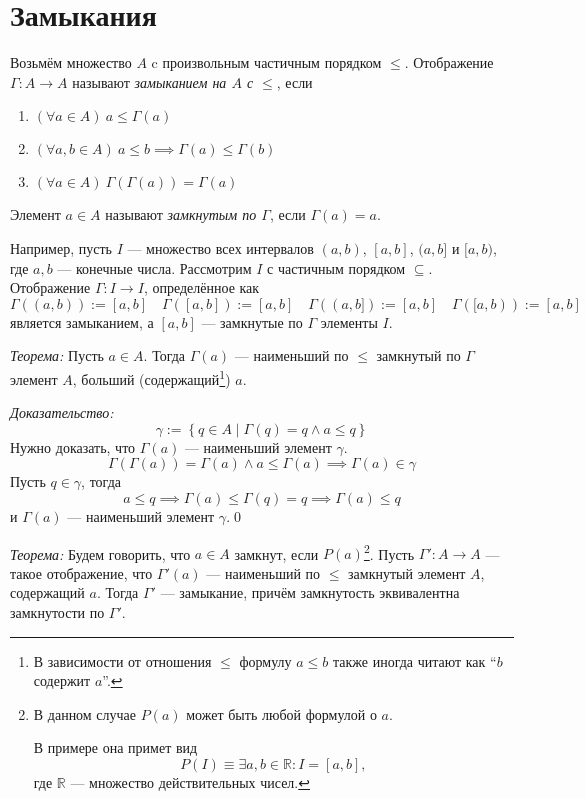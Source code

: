 \section{Замыкания}

Возьмём множество $A$ c произвольным частичным порядком $\leq$. Отображение
$\Gamma:A\to A$ называют {\it замыканием на $A$ с $\leq$}, если
\begin{enumerate}
  \item{}$(\forall a\in A)~a\leq\Gamma(a)$
  \item{}$(\forall a,b\in A)~a\leq b\implies \Gamma(a)\leq \Gamma(b)$
  \item{}$(\forall a\in A)~\Gamma(\Gamma(a))=\Gamma(a)$
\end{enumerate}
Элемент ${a\in A}$ называют {\it замкнутым по $\Gamma$},
если ${\Gamma(a)=a}$.

Например, пусть $I$ --- множество всех интервалов $(a,b)$, $[a,b]$, $(a,b]$
и $[a,b)$, где $a,b$ --- конечные числа.
Рассмотрим $I$ с частичным порядком $\subseteq$.
Отображение $\Gamma:I\to I$, определённое как
\[
  \Gamma((a,b)):=[a,b]\quad \Gamma([a,b]):=[a,b]\quad
  \Gamma((a,b]):=[a,b]\quad \Gamma([a,b)):=[a,b]
\]
является замыканием, а $[a,b]$ --- замкнутые по $\Gamma$ элементы $I$.

\vspace{1em}
{\it Теорема:} Пусть $a\in A$. Тогда $\Gamma(a)$ --- наименьший по $\leq$
замкнутый по $\Gamma$ элемент $A$,
больший (содержащий\footnote{В зависимости от отношения $\leq$ формулу
  $a\leq b$ также иногда читают как ``$b$ содержит $a$''.}) $a$.

  {\it Доказательство:}
\[
  \gamma:=\left\{q\in A\;\big|\; \Gamma(q)=q\land a\leq q\right\}
\]
Нужно доказать, что $\Gamma(a)$ --- наименьший элемент $\gamma$.
\[
  \Gamma(\Gamma(a))=\Gamma(a)\land a\leq\Gamma(a)\implies\Gamma(a)\in\gamma
\]
Пусть $q\in \gamma$, тогда
\[
  a\leq q\implies \Gamma(a)\leq\Gamma(q)=q\implies\Gamma(a)\leq q
\]
и $\Gamma(a)$ --- наименьший элемент $\gamma$.\qed

\newcommand\R{\mathbb R}
\vspace{1em}
{\it Теорема:}
Будем говорить, что ${a\in A}$ замкнут, если $P(a)$\footnote{В данном случае
$P(a)$ может быть любой формулой о $a$.

В примере она примет вид
\[
  P(I)\equiv \exists a,b\in\R:I=[a,b],
\]
где $\R$ --- множество действительных чисел.}.
Пусть ${\Gamma':A\to A}$ --- такое отображение, что $\Gamma'(a)$ --- наименьший по
$\leq$ замкнутый элемент $A$, содержащий $a$. Тогда $\Gamma'$ --- замыкание,
причём замкнутость эквивалентна замкнутости по $\Gamma'$.

